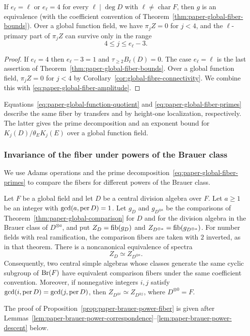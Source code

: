 \begin{corollary}\label{cor:paper-global-fiber-prime-four}
If $e_\ell=\ell$ or $e_\ell=4$ for every $\ell\mid \deg D$ with $\ell\ne\operatorname{char}F$, then $g$ is an equivalence (with the coefficient convention of Theorem~\ref{thm:paper-global-fiber-bounds}).
Over a global function field, we have $\pi_jZ=0$ for $j<4$, and the $\ell$-primary part of $\pi_jZ$ can survive only in the range
\[
 4\le j\le e_\ell-3.
\]
\end{corollary}
\begin{proof}
If $e_\ell=4$ then $e_\ell-3=1$ and $\tau_{\ge2}B_\ell(D)=0$.
The case $e_\ell=\ell$ is the last assertion of Theorem~\ref{thm:paper-global-fiber-bounds}.
Over a global function field, $\pi_jZ=0$ for $j<4$ by Corollary~\ref{cor:global-fibre-connectivity}.
We combine this with \eqref{eq:paper-global-fiber-amplitude}.
\end{proof}

\begin{remark}
Equations~\eqref{eq:paper-global-function-quotient} and \eqref{eq:paper-global-fiber-primes} describe the same fiber by transfers and by height-one localization, respectively.
The latter gives the prime decomposition and an exponent bound for $K_j(D)/\theta_EK_j(E)$ over a global function field.
\end{remark}

\subsubsection{Invariance of the fiber under powers of the Brauer class}
We use Adams operations and the prime decomposition~\eqref{eq:paper-global-fiber-primes} to compare the fibers for different powers of the Brauer class.

\begin{proposition}
\label{prop:paper-brauer-power-fiber}
Let $F$ be a global field and let $D$ be a central division algebra over $F$.
Let $a\ge1$ be an integer with $\gcd(a,\operatorname{per} D)=1$.
Let $g_D$ and $g_{D^{\otimes a}}$ be the comparisons of Theorem~\ref{thm:paper-global-comparison} for $D$ and for the division algebra in the Brauer class of $D^{\otimes a}$, and put $Z_D=\operatorname{fib}(g_D)$ and $Z_{D^{\otimes a}}=\operatorname{fib}(g_{D^{\otimes a}})$.
For number fields with real ramification, the comparison fibers are taken with $2$ inverted, as in that theorem.
There is a noncanonical equivalence of spectra
\[
 Z_D\simeq Z_{D^{\otimes a}}.
\]
Consequently, two central simple algebras whose classes generate the same cyclic subgroup of $\operatorname{Br}(F)$ have equivalent comparison fibers under the same coefficient convention.
Moreover, if nonnegative integers $i,j$ satisfy $\gcd(i,\operatorname{per} D)=\gcd(j,\operatorname{per} D)$, then $Z_{D^{\otimes i}}\simeq Z_{D^{\otimes j}}$, where $D^{\otimes0}=F$.
\end{proposition}
The proof of Proposition~\ref{prop:paper-brauer-power-fiber} is given after Lemmas~\ref{lem:paper-brauer-power-correspondence}--\ref{lem:paper-brauer-power-descent} below.

